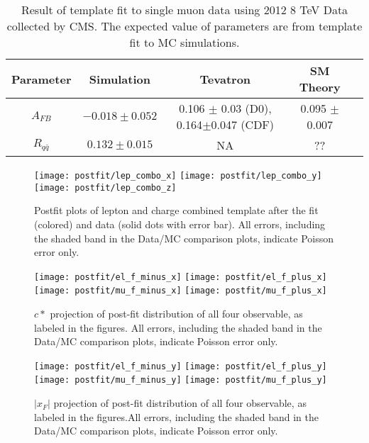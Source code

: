 \begin{table}[hbt]
\begin{center}
\begin{tabular}{c|cccc}\hline
Parameter                 & Simulation   & Tevatron & SM Theory  \\
\hline
$A_{FB}$					  & $-0.018 \pm 0.052 $  & 0.106 $\pm$ 0.03 (D0), 0.164$\pm$0.047 (CDF)  &  0.095 $\pm$ 0.007\\
$R_{q\bar{q}}$			  & $ 0.132 \pm 0.015 $  & NA & ?? \\
\end{tabular}
\end{center}
\label{tab:result_ref}
\caption{Result of template fit to single muon data using 2012 8 TeV Data collected by CMS.  The expected value of parameters are from template fit to MC simulations. }
\end{table}


\begin{figure}[hbt]
  \begin{center}
    \texttt{[image: postfit/lep\_combo\_x]}
    \texttt{[image: postfit/lep\_combo\_y]}
    \texttt{[image: postfit/lep\_combo\_z]}
  \caption{\small Postfit plots of lepton and charge combined template after the fit (colored) and data (solid dots with error bar). All errors, including the shaded band in the Data/MC comparison plots, indicate Poisson error only.}
    \label{fig:postfit combined}
  \end{center}
\end{figure}

\begin{figure}[hbt]
  \begin{center}
    \texttt{[image: postfit/el\_f\_minus\_x]}
    \texttt{[image: postfit/el\_f\_plus\_x]}
    \texttt{[image: postfit/mu\_f\_minus\_x]}
    \texttt{[image: postfit/mu\_f\_plus\_x]}
  \caption{\small $c*$ projection of post-fit distribution of all four observable, as labeled in the figures. All errors, including the shaded band in the Data/MC comparison plots, indicate Poisson error only.}
    \label{fig:postfit c*}
  \end{center}
\end{figure}

\begin{figure}[hbt]
  \begin{center}
    \texttt{[image: postfit/el\_f\_minus\_y]}
    \texttt{[image: postfit/el\_f\_plus\_y]}
    \texttt{[image: postfit/mu\_f\_minus\_y]}
    \texttt{[image: postfit/mu\_f\_plus\_y]}
  \caption{\small $|x_F|$ projection of post-fit distribution of all four observable, as labeled in the figures.All errors, including the shaded band in the Data/MC comparison plots, indicate Poisson error only.}
    \label{fig:postfit xf}
  \end{center}
\end{figure}

